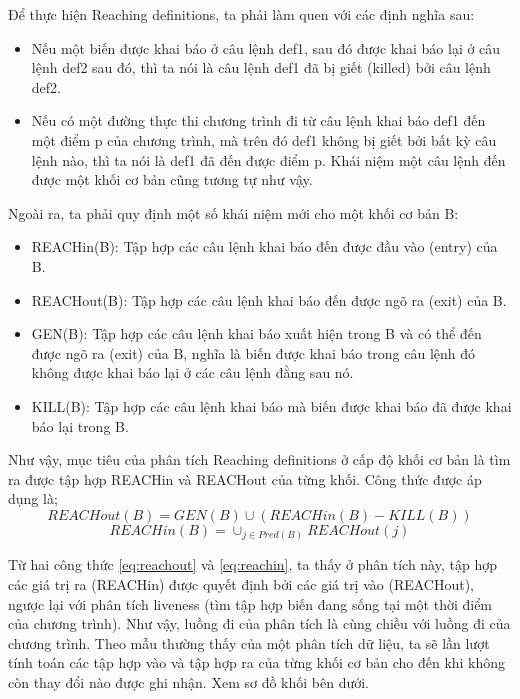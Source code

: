Để thực hiện Reaching definitions, ta phải làm quen với các định nghĩa sau:
\begin{itemize}
	\item Nếu một biến được khai báo ở câu lệnh def1, sau đó được khai báo lại ở câu lệnh def2 sau đó, thì ta nói là câu lệnh def1 đã bị giết (killed) bởi câu lệnh def2.
	\item Nếu có một đường thực thi chương trình đi từ câu lệnh khai báo def1 đến một điểm p của chương trình, mà trên đó def1 không bị giết bởi bất kỳ câu lệnh nào, thì ta nói là def1 đã đến được điểm p. Khái niệm một câu lệnh đến được một khối cơ bản cũng tương tự như vậy.
\end{itemize}

Ngoài ra, ta phải quy định một số khái niệm mới cho một khối cơ bản B:
\begin{itemize}
	\item REACHin(B): Tập hợp các câu lệnh khai báo đến được đầu vào (entry) của B.
	\item REACHout(B): Tập hợp các câu lệnh khai báo đến được ngõ ra (exit) của B.
	\item GEN(B): Tập hợp các câu lệnh khai báo xuất hiện trong B và có thể đến được ngõ ra (exit) của B, nghĩa là biến được khai báo trong câu lệnh đó không được khai báo lại ở các câu lệnh đằng sau nó.
	\item KILL(B): Tập hợp các câu lệnh khai báo mà biến được khai báo đã được khai báo lại trong B.
\end{itemize}

Như vậy, mục tiêu của phân tích Reaching definitions ở cấp độ khối cơ bản là tìm ra được tập hợp REACHin và REACHout của từng khối. Công thức được áp dụng là;
\begin{equation} \label{eq:reachout}
	REACHout(B) = GEN(B) \cup (REACHin(B)-KILL(B))
\end{equation}	
\begin{equation} \label{eq:reachin}
REACHin(B) = \cup_{j \in Pred(B)} REACHout(j)
\end{equation}	

Từ hai công thức \ref{eq:reachout} và \ref{eq:reachin}, ta thấy ở phân tích này, tập hợp các giá trị ra (REACHin) được quyết định bởi các giá trị vào (REACHout), ngược lại với phân tích liveness (tìm tập hợp biến đang sống tại một thời điểm của chương trình). Như vậy, luồng đi của phân tích là cùng chiều với luồng đi của chương trình. Theo mẫu thường thấy của một phân tích dữ liệu, ta sẽ lần lượt tính toán các tập hợp vào và tập hợp ra của từng khối cơ bản cho đến khi không còn thay đổi nào được ghi nhận. Xem sơ đồ khối bên dưới.

